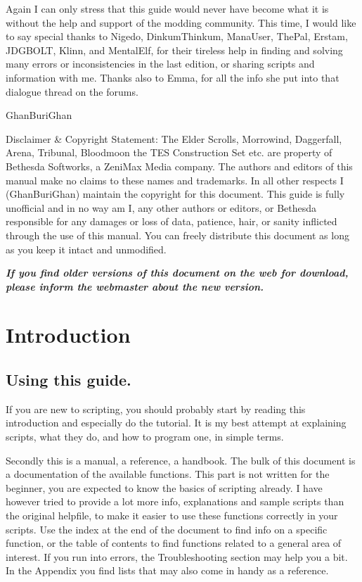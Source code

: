 \documentclass[oneside]{article}
\begin{document}
Again I can only stress that this guide would never have become what it is without the help and support of the modding community. This time, I would like to say special thanks to Nigedo, DinkumThinkum, ManaUser, ThePal, Erstam, JDGBOLT, Klinn, and MentalElf, for their tireless help in finding and solving many errors or inconsistencies in the last edition, or sharing scripts and information with me. Thanks also to Emma, for all the info she put into that dialogue thread on the forums.

GhanBuriGhan

Disclaimer \& Copyright Statement: The Elder Scrolls, Morrowind, Daggerfall, Arena, Tribunal, Bloodmoon the TES Construction Set etc. are property of Bethesda Softworks, a ZeniMax Media company. The authors and editors of this manual make no claims to these names and trademarks. In all other respects I (GhanBuriGhan) maintain the copyright for this document. This guide is fully unofficial and in no way am I, any other authors or editors, or Bethesda responsible for any damages or loss of data, patience, hair, or sanity inflicted through the use of this manual. You can freely distribute this document as long as you keep it intact and unmodified.

\emph{\textbf{If you find older versions of this document on the web for download, please inform the webmaster about the new version.}}


\section{Introduction}

\hypertarget{using-this-guide.}{%
\subsection{Using this guide.}\label{using-this-guide.}}

If you are new to scripting, you should probably start by reading this introduction and especially do the tutorial. It is my best attempt at explaining scripts, what they do, and how to program one, in simple terms.

Secondly this is a manual, a reference, a handbook. The bulk of this document is a documentation of the available functions. This part is not written for the beginner, you are expected to know the basics of scripting already. I have however tried to provide a lot more info, explanations and sample scripts than the original helpfile, to make it easier to use these functions correctly in your scripts. Use the index at the end of the document to find info on a specific function, or the table of contents to find functions related to a general area of interest. If you run into errors, the Troubleshooting section may help you a bit. In the Appendix you find lists that may also come in handy as a reference.
\end{document}
